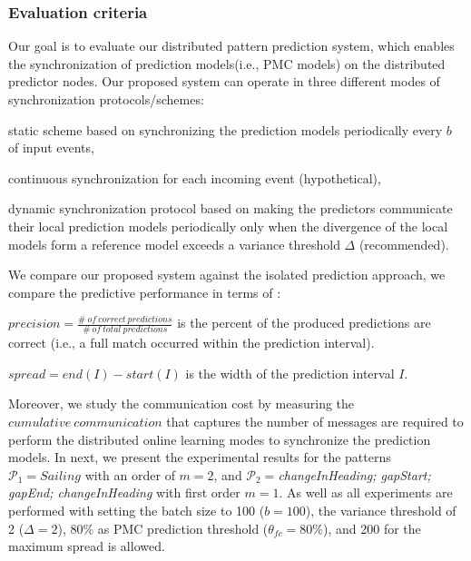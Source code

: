 \subsubsection*{Evaluation criteria} Our goal is to evaluate our distributed pattern prediction system, which enables the synchronization of prediction models(i.e., PMC models) on the distributed predictor nodes. Our proposed system can operate in three different modes of synchronization protocols/schemes: \begin{enumerate*}[label=(\roman*)] 
	\item static scheme based on synchronizing the prediction models periodically every $b$ of input events, 
\item continuous synchronization for each incoming event (hypothetical), 
\item dynamic synchronization protocol based on making the predictors communicate their local prediction models periodically only when the divergence of the local models form a reference model exceeds a variance threshold $\Delta$ (recommended).
 	   
\end{enumerate*}
We compare our proposed system against the isolated prediction approach, we compare the predictive performance in terms of :
\begin{enumerate*}[label=(\roman*)]
	
\item  $\mathit{precision = \frac{\#\ of\ correct\ predictions}{\#\ of\ total\ predictions}}$ is the percent of the produced predictions are correct (i.e., a full match occurred within the prediction interval).   

\item $\mathit{spread} =end(I) -start(I)$ is the width of the prediction interval $I$. 

\end{enumerate*} 
\par Moreover, we study the communication cost by measuring the $\mathit{cumulative\ communication}$ that captures the number of messages are required to perform the distributed online learning modes to synchronize the prediction models. In next, we present the experimental results for the patterns  $\mathcal{P}_1=Sailing$ with an order of $m=2$, and   $\mathcal{P}_2=$\textit{changeInHeading; gapStart; gapEnd; changeInHeading} with first order $m=1$. As well as all experiments are performed with setting the batch size to 100  ($b=100$), the variance threshold of 2 ($\Delta=2$), $80\%$ as PMC prediction threshold ($\theta_{fc}=80\%$), and 200 for the maximum spread is allowed.

